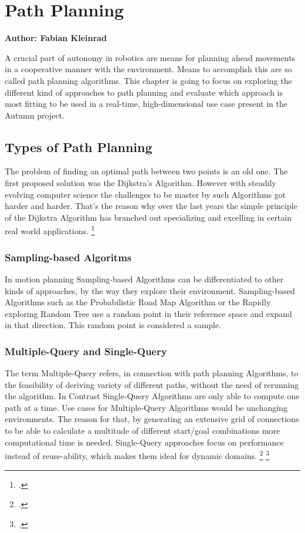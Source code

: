 \chapter{Path Planning}

\textbf{Author: Fabian Kleinrad} 

A crucial part of autonomy in robotics are means for planning ahead movements in a cooperative manner with the environment. Means to accomplish this are so called path planning algorithms. This chapter is going to focus on exploring the different kind of approaches to path planning and evaluate which approach is most fitting to be used in a real-time, high-dimensional use case present in the Autumn project.


\section{Types of Path Planning}

The problem of finding an optimal path between two points is an old one.
The first proposed solution was the Dijkstra's Algorithm. However with steadily evolving computer science the challenges to be master by such Algorithms got harder and harder. That's the reason why over the last years the simple principle of the Dijkstra Algorithm has branched out specializing and excelling in certain real world applications.
\footcite{Pan2020}

\subsection{Sampling-based Algoritms}

In motion planning Sampling-based Algorithms can be differentiated to other kinds of approaches, by the way they explore their environment. Sampling-based Algorithms such as the Probabilistic Road Map Algorithm or the Rapidly exploring Random Tree use a random point in their reference space and expand in that direction. This random point is considered a sample.

\subsection{Multiple-Query and Single-Query}

The term Multiple-Query refers, in connection with path planning Algorithms, to the feasibility of deriving variety of different paths, without the need of rerunning the algorithm. In Contrast Single-Query Algorithms are only able to compute one path at a time.\newline
Use cases for Multiple-Query Algorithms would be unchanging environments. The reason for that, by generating an extensive grid of connections to be able to calculate a multitude of different start/goal combinations  more computational time is needed.\newline
Single-Query approaches focus on performance instead of reuse-ability, which makes them ideal for dynamic domains. 
\footcite{Bekris2003}
\footcite{stackexchangeMultiSingleQuery2019}

